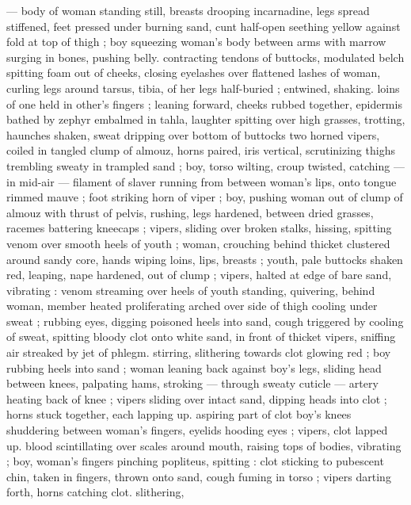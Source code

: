 --- body of woman standing still, breasts drooping incarnadine, legs 
spread stiffened, feet pressed under burning sand, cunt half-open 
seething yellow against fold at top of thigh ; boy squeezing woman's 
body between arms with marrow surging in bones, pushing belly. 
contracting tendons of buttocks, modulated belch spitting foam out 
of cheeks, closing eyelashes over flattened lashes of woman, curling 
legs around tarsus, tibia, of her legs half-buried ; entwined, shaking. 
loins of one held in other's fingers ; leaning forward, cheeks rubbed 
together, epidermis bathed by zephyr embalmed in tahla, laughter 
spitting over high grasses, trotting, haunches shaken, sweat dripping 
over bottom of buttocks {\col} two horned vipers, coiled in tangled clump 
of almouz, horns paired, iris vertical, scrutinizing thighs trembling 
sweaty in trampled sand ; boy, torso wilting, croup twisted, catching 
--- in mid-air --- filament of slaver running from between woman's 
lips, onto tongue rimmed mauve ; foot striking horn of viper ; boy,
pushing woman out of clump of almouz with thrust of pelvis,
rushing, legs hardened, between dried grasses, racemes battering 
kneecaps ; vipers, sliding over broken stalks, hissing, spitting venom 
over smooth heels of youth ; woman, crouching behind thicket 
clustered around sandy core, hands wiping loins, lips, breasts ; 
youth, pale buttocks shaken red, leaping, nape hardened, out of 
clump ; vipers, halted at edge of bare sand, vibrating : venom 
streaming over heels of youth standing, quivering, behind woman, 
member heated proliferating arched over side of thigh cooling under 
sweat ; rubbing eyes, digging poisoned heels into sand, cough 
triggered by cooling of sweat, spitting bloody clot onto white sand, 
in front of thicket {\col} vipers, sniffing air streaked by jet of phlegm. 
stirring, slithering towards clot glowing red ; boy rubbing heels into 
sand ; woman leaning back against boy's legs, sliding head between 
knees, palpating hams, stroking --- through sweaty cuticle --- 
 artery heating back of knee ; vipers sliding over intact 
sand, dipping heads into clot ; horns stuck together, each lapping up. 
aspiring part of clot {\col} boy's knees shuddering between woman's 
fingers, eyelids hooding eyes ; vipers, clot lapped up. blood 
scintillating over scales around mouth, raising tops of bodies, 
vibrating ; boy, woman's fingers pinching popliteus, spitting : clot 
sticking to pubescent chin, taken in fingers, thrown onto sand, cough 
fuming in torso ; vipers darting forth, horns catching clot. slithering, 
